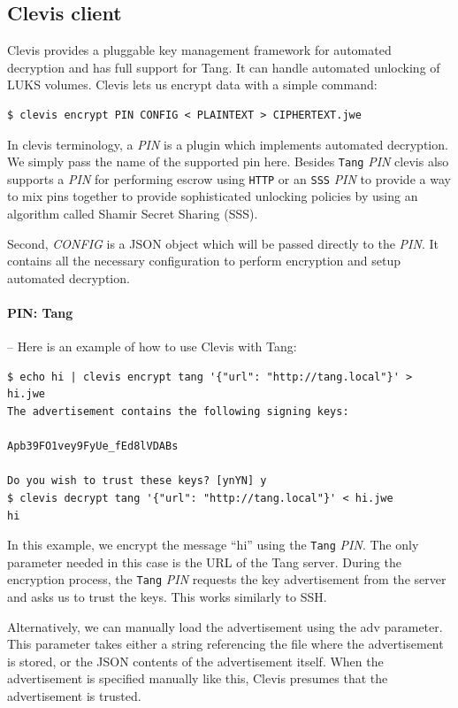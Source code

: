 \subsection{Clevis client}\label{clevis}

Clevis provides a pluggable key management framework for automated decryption and has full support for Tang.
It can handle automated unlocking of LUKS volumes.
Clevis lets us encrypt data with a simple command:
\begin{lstlisting}[columns=fixed,basicstyle=\ttfamily\footnotesize,tabsize=4,backgroundcolor=\color{yellow!10}]
$ clevis encrypt PIN CONFIG < PLAINTEXT > CIPHERTEXT.jwe
\end{lstlisting}
In clevis terminology, a {\it PIN} is a plugin which implements automated decryption.
We simply pass the name of the supported pin here.
Besides {\tt Tang} {\it PIN} clevis also supports a {\it PIN} for performing escrow using {\tt HTTP} or an {\tt SSS} {\it PIN} to provide a way to mix pins together to provide sophisticated unlocking policies by using an algorithm called Shamir Secret Sharing (SSS).%

Second, {\it CONFIG} is a JSON object which will be passed directly to the {\it PIN}.
It contains all the necessary configuration to perform encryption and setup automated decryption.


\paragraph{PIN: Tang} -- Here is an example of how to use Clevis with Tang:
\begin{lstlisting}[columns=fixed,basicstyle=\ttfamily\footnotesize,tabsize=4,backgroundcolor=\color{yellow!10}]
$ echo hi | clevis encrypt tang '{"url": "http://tang.local"}' > hi.jwe
The advertisement contains the following signing keys:

Apb39FO1vey9FyUe_fEd8lVDABs

Do you wish to trust these keys? [ynYN] y
$ clevis decrypt tang '{"url": "http://tang.local"}' < hi.jwe
hi
\end{lstlisting}
In this example, we encrypt the message “hi” using the {\tt Tang} {\it PIN}.
The only parameter needed in this case is the URL of the Tang server.
During the encryption process, the {\tt Tang} {\it PIN} requests the key advertisement from the server and asks us to trust the keys.
This works similarly to SSH.

Alternatively, we can manually load the advertisement using the adv parameter.
This parameter takes either a string referencing the file where the advertisement is stored, or the JSON contents of the advertisement itself.
When the advertisement is specified manually like this, Clevis presumes that the advertisement is trusted.



